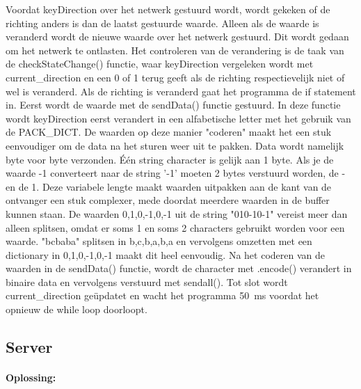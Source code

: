 Voordat keyDirection over het netwerk gestuurd wordt, wordt gekeken of de richting anders is dan de laatst gestuurde waarde. Alleen als de waarde is veranderd wordt de nieuwe waarde over het netwerk gestuurd. Dit wordt gedaan om het netwerk te ontlasten. Het controleren van de verandering is de taak van de checkStateChange() functie, waar keyDirection vergeleken wordt met current\_direction en een 0 of 1 terug geeft als de richting respectievelijk niet of wel is veranderd. Als de richting is veranderd gaat het programma de if statement in. Eerst wordt de waarde met de sendData() functie gestuurd. In deze functie wordt keyDirection eerst verandert in een alfabetische letter met het gebruik van de PACK\_DICT. De waarden op deze manier "coderen" maakt het een stuk eenvoudiger om de data na het sturen weer uit te pakken. 
Data wordt namelijk byte voor byte verzonden. \'E\'en string character is gelijk aan 1 byte. Als je de waarde -1 converteert naar de string '-1' moeten 2 bytes verstuurd worden, de - en de 1. Deze variabele lengte maakt waarden uitpakken aan de kant van de ontvanger een stuk complexer, mede doordat meerdere waarden in de buffer kunnen staan. De waarden 0,1,0,-1,0,-1 uit de string "010-10-1" vereist meer dan alleen splitsen, omdat er soms 1 en soms 2 characters gebruikt worden voor een waarde. "bcbaba" splitsen in b,c,b,a,b,a en vervolgens omzetten met een dictionary in 0,1,0,-1,0,-1 maakt dit heel eenvoudig. 
Na het coderen van de waarden in de sendData() functie, wordt de character met .encode() verandert in binaire data en vervolgens verstuurd met sendall().
Tot slot wordt current\_direction ge\"updatet en wacht het programma \SI{50}{\milli\second} voordat het opnieuw de while loop doorloopt. 


\newpage
\subsection{Server}\label{sub:KeyboardServoServer}
\paragraph{Oplossing:}



